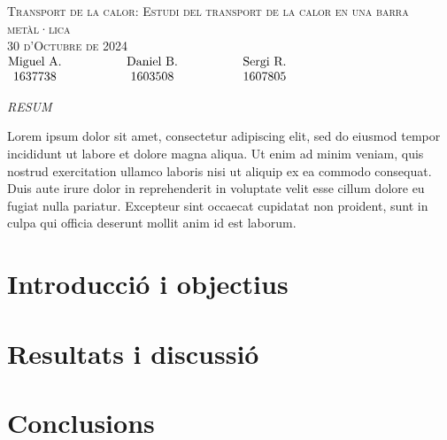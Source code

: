 \documentclass[12pt,twosides,onecolumn,openany]{article}
\begin{document}
\begin{center}
    {\Large \textsc{Transport de la calor: Estudi del transport de la calor en una barra metàl·lica}}\\
    \vspace{0.2cm}
    \textsc{30 d'Octubre de 2024}\\
    \vspace{0.2cm}
    $\begin{matrix} 
    \text{Miguel A.} \hspace{1.5cm} & \text{Daniel B.} & \hspace{1.5cm} \text{Sergi R.}\\1637738 \hspace{1.5cm} & 1603508 & \hspace{1.5cm} 1607805
    \end{matrix}$
\end{center}
\begin{center}
    \textsc{\textit{RESUM}}
\end{center}
Lorem ipsum dolor sit amet, consectetur adipiscing elit, sed do eiusmod tempor incididunt ut labore et dolore magna aliqua. Ut enim ad minim veniam, quis nostrud exercitation ullamco laboris nisi ut aliquip ex ea commodo consequat. Duis aute irure dolor in reprehenderit in voluptate velit esse cillum dolore eu fugiat nulla pariatur. Excepteur sint occaecat cupidatat non proident, sunt in culpa qui officia deserunt mollit anim id est laborum. \cite{prueba}
\vspace{0.5cm}
\begin{multicols}{2}
\section{Introducció i objectius}
\section{Resultats i discussió}
\section{Conclusions}
\end{multicols}
\end{document}
